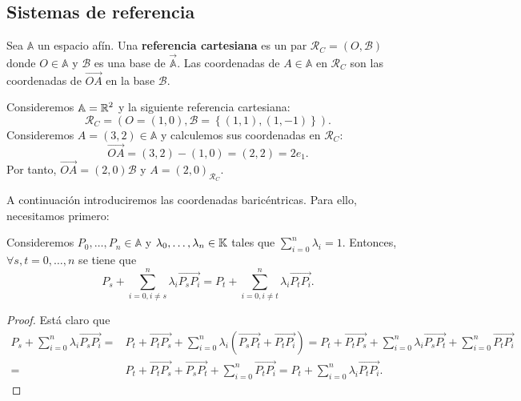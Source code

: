 \subsection{Sistemas de referencia}
\begin{definition}
Sea $\displaystyle \mathbb{A} $ un espacio afín. Una \textbf{referencia cartesiana} es un par $\displaystyle \mathcal{R}_{C}= \left(O,\mathcal{B}\right) $ donde $\displaystyle O \in \mathbb{A} $ y $\displaystyle \mathcal{B} $ es una base de $\displaystyle \vec{\mathbb{A}} $. Las coordenadas de $\displaystyle A \in \mathbb{A} $ en $\displaystyle \mathcal{R}_{C} $ son las coordenadas de $\displaystyle \overrightarrow{OA} $ en la base $\displaystyle \mathcal{B} $.
\end{definition}
\begin{eg}
Consideremos $\displaystyle \mathbb{A} = \mathbb{R}^{2} $ y la siguiente referencia cartesiana:
\[ \mathcal{R}_{C} = \left( O = \left(1,0\right), \mathcal{B} = \left\{ \left(1,1\right), \left(1,-1\right)\right\} \right) .\]
Consideremos $\displaystyle A = \left(3,2\right) \in \mathbb{A} $ y calculemos sus coordenadas en $\displaystyle \mathcal{R}_{C} $:
\[\overrightarrow{OA} = \left(3,2\right)-\left(1,0\right) = \left(2,2\right) = 2e_{1} .\]
Por tanto, $\displaystyle \overrightarrow{OA} = \left(2,0\right)\mathcal{B} $ y $\displaystyle A = \left(2,0\right)_{\mathcal{R}_{C}} $.
\end{eg}
A continuación introduciremos las coordenadas baricéntricas. Para ello, necesitamos primero:
\begin{prop}
Consideremos $\displaystyle P_{0}, \ldots, P_{n} \in \mathbb{A} $ y $\displaystyle \lambda_{0}, \ldots, \lambda_{n} \in \mathbb{K} $ tales que $\displaystyle \sum^{n}_{i = 0}\lambda_{i} = 1 $. Entonces, $\displaystyle \forall s,t = 0, \ldots, n $ se tiene que 
\[P_{s} + \sum^{n}_{i = 0, i \neq s}\lambda_{i}\overrightarrow{P_{s}P_{i}} = P_{t} + \sum^{n}_{i = 0, i \neq t}\lambda_{i}\overrightarrow{P_{t}P_{i}} .\]
\end{prop}
\begin{proof}
Está claro que
\[
\begin{split}
	P_{s} + \sum^{n}_{i = 0}\lambda_{i}\overrightarrow{P_{s}P_{i}} = & P_{t} + \overrightarrow{P_{t}P_{s}} + \sum^{n}_{i = 0}\lambda_{i}\left(\overrightarrow{ P_{s}P_{t}} + \overrightarrow{P_{t}P_{i}}\right) 
	=  P_{t} + \overrightarrow{P_{t}P_{s}} + \sum^{n}_{i = 0 }\lambda_{i}\overrightarrow{P_{s}P_{t}} + \sum^{n}_{i = 0}\overrightarrow{P_{t}P_{i}} \\
	= & P_{t} + \overrightarrow{P_{t}P_{s}} + \overrightarrow{P_{s}P_{t}} + \sum^{n}_{i = 0}\overrightarrow{P_{t}P_{i}} = P_{t} + \sum^{n}_{i = 0}\lambda_{i}\overrightarrow{P_{t}P_{i}} .
\end{split}
\]
\end{proof}
